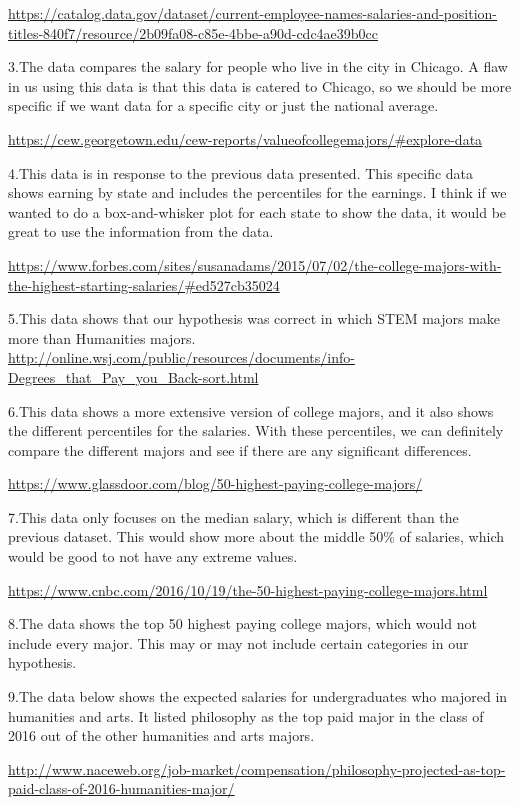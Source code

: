 \documentclass[]{article}
\begin{document}
\url{https://catalog.data.gov/dataset/current-employee-names-salaries-and-position-titles-840f7/resource/2b09fa08-c85e-4bbe-a90d-cdc4ae39b0cc}

3.The data compares the salary for people who live in the city in
Chicago. A flaw in us using this data is that this data is catered to
Chicago, so we should be more specific if we want data for a specific
city or just the national average.

\url{https://cew.georgetown.edu/cew-reports/valueofcollegemajors/\#explore-data}

4.This data is in response to the previous data presented. This specific
data shows earning by state and includes the percentiles for the
earnings. I think if we wanted to do a box-and-whisker plot for each
state to show the data, it would be great to use the information from
the data.

\url{https://www.forbes.com/sites/susanadams/2015/07/02/the-college-majors-with-the-highest-starting-salaries/\#ed527cb35024}

5.This data shows that our hypothesis was correct in which STEM majors
make more than Humanities majors.
\url{http://online.wsj.com/public/resources/documents/info-Degrees_that_Pay_you_Back-sort.html}

6.This data shows a more extensive version of college majors, and it
also shows the different percentiles for the salaries. With these
percentiles, we can definitely compare the different majors and see if
there are any significant differences.

\url{https://www.glassdoor.com/blog/50-highest-paying-college-majors/}

7.This data only focuses on the median salary, which is different than
the previous dataset. This would show more about the middle 50\% of
salaries, which would be good to not have any extreme values.

\url{https://www.cnbc.com/2016/10/19/the-50-highest-paying-college-majors.html}

8.The data shows the top 50 highest paying college majors, which would
not include every major. This may or may not include certain categories
in our hypothesis.

9.The data below shows the expected salaries for undergraduates who
majored in humanities and arts. It listed philosophy as the top paid
major in the class of 2016 out of the other humanities and arts majors.

\url{http://www.naceweb.org/job-market/compensation/philosophy-projected-as-top-paid-class-of-2016-humanities-major/}
\end{document}
